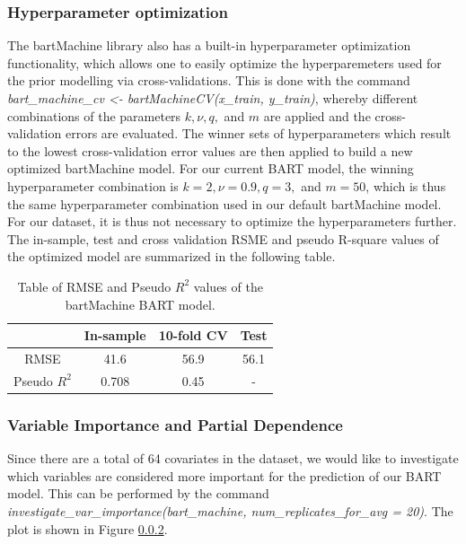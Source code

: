 \documentclass{usiinftr}
\begin{document}
\subsubsection{Hyperparameter optimization}
The bartMachine library also has a built-in hyperparameter optimization functionality, which allows one to easily optimize the hyperparemeters used for the prior modelling via cross-validations. This is done with the command \textit{bart\_machine\_cv <- bartMachineCV(x\_train, y\_train)}, whereby different combinations of the parameters $k, \nu, q,$ and $m$ are applied and the cross-validation errors are evaluated. The winner sets of hyperparameters which result to the lowest cross-validation error values are then applied to build a new optimized bartMachine model. For our current BART model, the winning hyperparameter combination is  $k = 2, \nu = 0.9, q = 3,$ and $m = 50$, which is thus the same hyperparameter combination used in our default bartMachine model. For our dataset, it is thus not necessary to optimize the hyperparameters further. The in-sample, test and cross validation RSME and pseudo R-square values of the optimized model are summarized in the following table.

\begin{table}[h!]
\centering
\caption{Table of RMSE and Pseudo $R^2$ values of the bartMachine BART model.}
\begin{tabular}{|c|c|c|c|}
\hline & In-sample & 10-fold CV & Test \\
\hline RMSE & 41.6 & 56.9 & 56.1 \\
\hline Pseudo $R^2$ & 0.708 & 0.45 & - \\ \hline
\end{tabular}
\label{RMSEBART}
\end{table}

\subsubsection{Variable Importance and Partial Dependence}
Since there are a total of 64 covariates in the dataset, we would like to investigate which variables are considered more important for the prediction of our BART model. This can be performed by the command \textit{investigate\_var\_importance(bart\_machine, num\_replicates\_for\_avg = 20)}. The plot is shown in Figure \ref{}.
\end{document}
